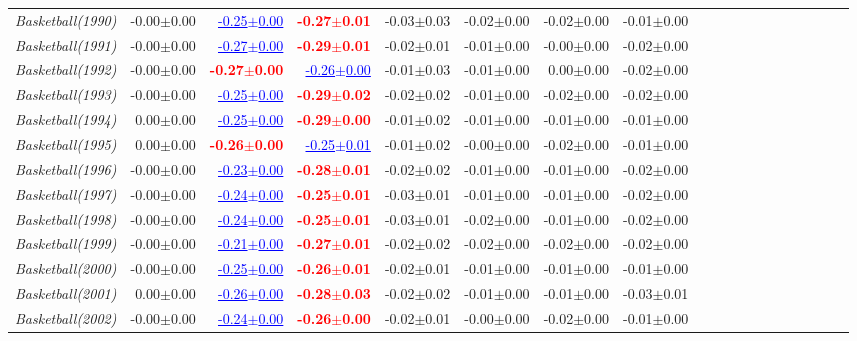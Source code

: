\documentclass[nohyperref]{article}
\theoremstyle{plain}
\theoremstyle{definition}
\theoremstyle{remark}
\newcommand{\red}[1]{\textcolor{red}{\textbf{#1}}}
\newcommand{\blue}[1]{\textcolor{blue}{\underline{#1}}}
\begin{document}
\begin{table*}[!ht]
{\begin{tabular}{lrrrrrrrrrrrrrrrrrr}
			{\it Basketball(1990)} & -0.00$\pm$0.00 & \blue{-0.25$\pm$0.00} & \red{-0.27$\pm$0.01} & -0.03$\pm$0.03 & -0.02$\pm$0.00 & -0.02$\pm$0.00 & -0.01$\pm$0.00 \\
			{\it Basketball(1991)} & -0.00$\pm$0.00 & \blue{-0.27$\pm$0.00} & \red{-0.29$\pm$0.01} & -0.02$\pm$0.01 & -0.01$\pm$0.00 & -0.00$\pm$0.00 & -0.02$\pm$0.00 \\
			{\it Basketball(1992)} & -0.00$\pm$0.00 & \red{-0.27$\pm$0.00} & \blue{-0.26$\pm$0.00} & -0.01$\pm$0.03 & -0.01$\pm$0.00 & 0.00$\pm$0.00 & -0.02$\pm$0.00 \\
			{\it Basketball(1993)} & -0.00$\pm$0.00 & \blue{-0.25$\pm$0.00} & \red{-0.29$\pm$0.02} & -0.02$\pm$0.02 & -0.01$\pm$0.00 & -0.02$\pm$0.00 & -0.02$\pm$0.00 \\
			{\it Basketball(1994)} & 0.00$\pm$0.00 & \blue{-0.25$\pm$0.00} & \red{-0.29$\pm$0.00} & -0.01$\pm$0.02 & -0.01$\pm$0.00 & -0.01$\pm$0.00 & -0.01$\pm$0.00 \\
			{\it Basketball(1995)} & 0.00$\pm$0.00 & \red{-0.26$\pm$0.00} & \blue{-0.25$\pm$0.01} & -0.01$\pm$0.02 & -0.00$\pm$0.00 & -0.02$\pm$0.00 & -0.01$\pm$0.00 \\
			{\it Basketball(1996)} & -0.00$\pm$0.00 & \blue{-0.23$\pm$0.00} & \red{-0.28$\pm$0.01} & -0.02$\pm$0.02 & -0.01$\pm$0.00 & -0.01$\pm$0.00 & -0.02$\pm$0.00 \\
			{\it Basketball(1997)} & -0.00$\pm$0.00 & \blue{-0.24$\pm$0.00} & \red{-0.25$\pm$0.01} & -0.03$\pm$0.01 & -0.01$\pm$0.00 & -0.01$\pm$0.00 & -0.02$\pm$0.00 \\
			{\it Basketball(1998)} & -0.00$\pm$0.00 & \blue{-0.24$\pm$0.00} & \red{-0.25$\pm$0.01} & -0.03$\pm$0.01 & -0.02$\pm$0.00 & -0.01$\pm$0.00 & -0.02$\pm$0.00 \\
			{\it Basketball(1999)} & -0.00$\pm$0.00 & \blue{-0.21$\pm$0.00} & \red{-0.27$\pm$0.01} & -0.02$\pm$0.02 & -0.02$\pm$0.00 & -0.02$\pm$0.00 & -0.02$\pm$0.00 \\
			{\it Basketball(2000)} & -0.00$\pm$0.00 & \blue{-0.25$\pm$0.00} & \red{-0.26$\pm$0.01} & -0.02$\pm$0.01 & -0.01$\pm$0.00 & -0.01$\pm$0.00 & -0.01$\pm$0.00 \\
			{\it Basketball(2001)} & 0.00$\pm$0.00 & \blue{-0.26$\pm$0.00} & \red{-0.28$\pm$0.03} & -0.02$\pm$0.02 & -0.01$\pm$0.00 & -0.01$\pm$0.00 & -0.03$\pm$0.01 \\
			{\it Basketball(2002)} & -0.00$\pm$0.00 & \blue{-0.24$\pm$0.00} & \red{-0.26$\pm$0.00} & -0.02$\pm$0.01 & -0.00$\pm$0.00 & -0.02$\pm$0.00 & -0.01$\pm$0.00 \\

\end{tabular}}
\end{table*}
\end{document}
